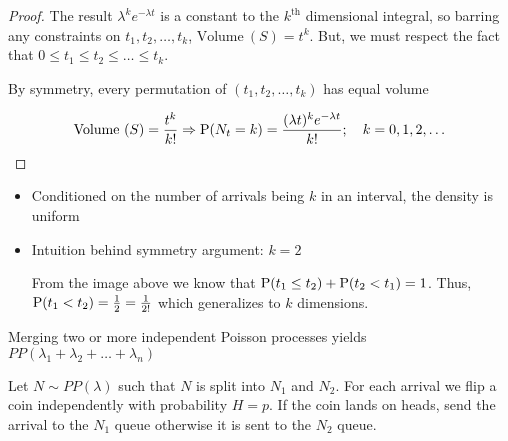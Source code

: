 \begin{theorem}
\begin{proof}
    The result $\lambda^k e^{-\lambda t}$ is a constant to the
    $k^{\text{th}}$ dimensional integral, so barring any constraints on
    $t_1,t_2,\ldots,t_k$, $\textrm{Volume}\ (S) = t^k$. But, we must
    respect the fact that $0 \le t_1 \le t_2 \le \ldots \le t_k$.

    By symmetry, every permutation of $(t_1,t_2,\ldots,t_k)$ has
    equal volume

    \begin{displaymath}
      \textrm{Volume}\ (S) = \frac{t^k}{k!} \Rightarrow \operatorname{\mathrm{P}}(N_t = k)
      = \frac{(\lambda t)^k e^{-\lambda t}}{k!}; \quad k=0,1,2,\ldots
    \end{displaymath}

  \end{proof}

  \begin{itemize}
    \item Conditioned on the number of arrivals being $k$ in an
      interval, the density is uniform
    \item Intuition behind symmetry argument: $k=2$
      \begin{center}
      \end{center}
      From the image above we know that 
      $\operatorname{\mathrm{P}}(t_1 \le t_2) + \operatorname{\mathrm{P}}(t_2 < t_1) = 1$. Thus,
      $\operatorname{\mathrm{P}}(t_1 < t_2) = \frac{1}{2} = \frac{1}{2!}$ which generalizes
      to $k$ dimensions.
  \end{itemize}

\end{theorem}

\begin{definition}
  Merging two or more independent Poisson processes yields
  $PP(\lambda_1 + \lambda_2 + \ldots + \lambda_n)$
\end{definition}

\begin{definition}
  Let $N \sim PP(\lambda)$ such that $N$ is split into $N_1$ and $N_2$.
  For each arrival we flip a coin independently with probability
  $H = p$. If the coin lands on heads, send the arrival to the $N_1$
  queue otherwise it is sent to the $N_2$ queue.
\end{definition}
